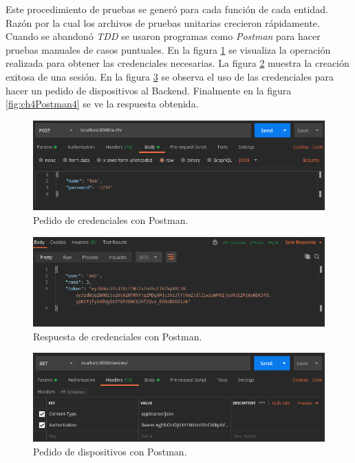 Este procedimiento de pruebas se generó para cada función de cada entidad.
Razón por la cual los archivos de pruebas unitarias crecieron rápidamente.
Cuando se abandonó \emph{TDD} se usaron programas como \emph{Postman} para hacer pruebas manuales de casos puntuales.
En la figura \ref{fig:ch4Postman1} se visualiza la operación realizada para obtener las credenciales necesarias.
La figura \ref{fig:ch4Postman2} muestra la creación exitosa de una sesión.
En la figura \ref{fig:ch4Postman3} se observa el uso de las credenciales para hacer un pedido de dispositivos al Backend.
Finalmente en la figura \ref{fig:ch4Postman4} se ve la respuesta obtenida. 


\begin{figure}[h]
	\centering
	\includegraphics[width=\textwidth]{./Figures/postman1.png}
	\caption{Pedido de credenciales con Postman.}
	\label{fig:ch4Postman1}
\end{figure}

\begin{figure}[h]
	\centering
	\includegraphics[width=\textwidth]{./Figures/postman2.png}
	\caption{Respuesta de credenciales con Postman.}
	\label{fig:ch4Postman2}
\end{figure}

\begin{figure}[h]
	\centering
	\includegraphics[width=\textwidth]{./Figures/postman3.png}
	\caption{Pedido de dispositivos con Postman.}
	\label{fig:ch4Postman3}
\end{figure}

